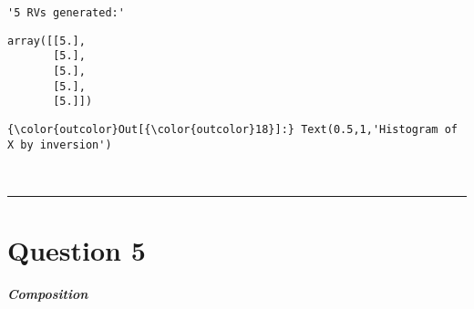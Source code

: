 \documentclass[11pt]{article}
\begin{document}
    
    \begin{verbatim}
'5 RVs generated:'
    \end{verbatim}

    
    
    \begin{verbatim}
array([[5.],
       [5.],
       [5.],
       [5.],
       [5.]])
    \end{verbatim}

    
\begin{Verbatim}[commandchars=\\\{\}]
{\color{outcolor}Out[{\color{outcolor}18}]:} Text(0.5,1,'Histogram of X by inversion')
\end{Verbatim}
            
    \begin{center}
    \end{center}
    { \hspace*{\fill} \\}
    
    \begin{center}\rule{0.5\linewidth}{\linethickness}\end{center}

\section*{Question 5}

\textbf{\emph{Composition}}
\end{document}
